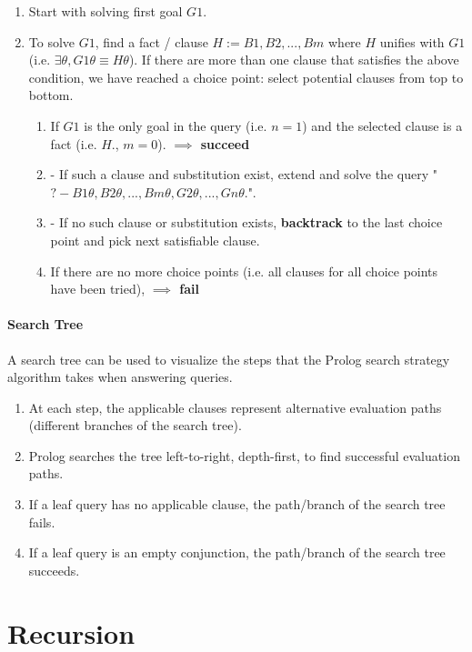 \documentclass{article}
\begin{document}
\begin{multicols}{2}
  \begin{enumerate}
  \item Start with solving first goal $G1$.
  \item To solve $G1$, find a fact / clause $H := B1, B2, ..., Bm$ where $H$ unifies with $G1$ (i.e. $\exists\theta, G1\theta \equiv H\theta$). If there are more than one clause that satisfies the above condition, we have reached a choice point: select potential clauses from top to bottom. 
  \begin{enumerate}
  \item If $G1$ is the only goal in the query (i.e. $n=1$) and the selected clause is a fact (i.e. $H.$, $m=0$). {\bf $\implies$ succeed}
  \item - If such a clause and substitution exist, extend and solve the query "$?- B1\theta, B2\theta, ..., Bm\theta, G2\theta, ..., Gn\theta.$".
  \item - If no such clause or substitution exists, {\bf backtrack} to the last choice point and pick next satisfiable clause.
  \item If there are no more choice points (i.e. all clauses for all choice points have been tried), {\bf $\implies$ fail}
  \end{enumerate}
  \end{enumerate}
  
  \paragraph{Search Tree} A search tree can be used to visualize the steps that the Prolog search strategy algorithm takes when answering queries.
  
  \begin{enumerate}
  \item At each step, the applicable clauses represent alternative evaluation paths (different branches of the search tree).
  \item Prolog searches the tree left-to-right, depth-first, to find successful evaluation paths.
  \item If a leaf query has no applicable clause, the path/branch of the search tree fails.
  \item If a leaf query is an empty conjunction, the path/branch of the search tree succeeds.
  \end{enumerate}
  
  \section{Recursion}
  

\end{multicols}
\end{document}
